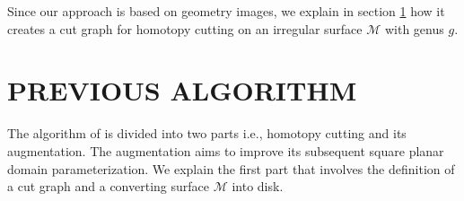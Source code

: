 \documentclass[a4paper,twoside]{article}
\begin{document}
Since our approach is based on geometry images, we explain in section \ref{sec:previous algorithm} how it creates a cut graph for homotopy cutting on an irregular surface $\mathscr{M}$ with genus $g$.
\section{\uppercase{Previous Algorithm}}
\label{sec:previous algorithm}
\noindent The algorithm of \cite{Gu:2002:GI:566654.566589} is divided into two parts i.e., homotopy cutting and its augmentation. The augmentation aims to improve its subsequent square planar domain parameterization. We explain the first part that involves the definition of a cut graph and a converting surface $\mathscr{M}$ into disk.

\begin{figure}[t]
	\centering		
	\hspace{10pt}
	\hspace{0.000\columnwidth}
	\hspace{10pt}		
	\hspace{0.000\columnwidth}
	\hspace{10pt}		

\end{figure}
\end{document}

